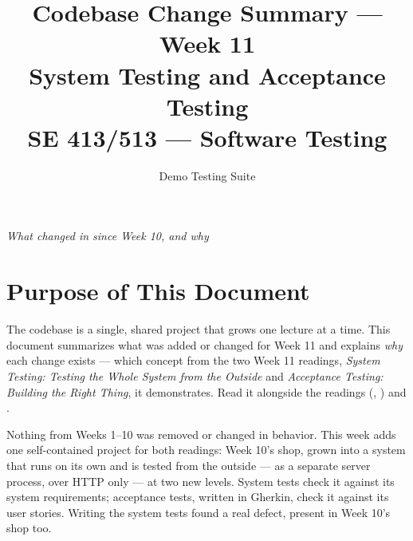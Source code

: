 \documentclass[11pt]{article}
\title{
  \textbf{Codebase Change Summary --- Week 11}\\[4pt]
  \large System Testing and Acceptance Testing\\[2pt]
  \normalsize SE 413/513 --- Software Testing
}
\author{Demo Testing Suite}
\date{}
\begin{document}
\maketitle

\begin{center}
\textit{What changed in  since Week 10, and why}
\end{center}

\vspace{0.3cm}

\section{Purpose of This Document}
The  codebase is a single, shared project that
grows one lecture at a time. This document summarizes what was added or
changed for Week 11 and explains \emph{why} each change exists --- which
concept from the two Week 11 readings, \textit{System Testing: Testing
the Whole System from the Outside} and \textit{Acceptance Testing:
Building the Right Thing}, it demonstrates. Read it alongside the
readings (,
) and
.

\begin{keyidea}
Nothing from Weeks 1--10 was removed or changed in behavior. This week
adds one self-contained project for both readings: Week 10's shop,
grown into a system that runs on its own and is tested from the outside
--- as a separate server process, over HTTP only --- at two new levels.
System tests check it against its system requirements; acceptance
tests, written in Gherkin, check it against its user stories. Writing
the system tests found a real defect, present in Week 10's shop too.
\end{keyidea}

\end{document}
